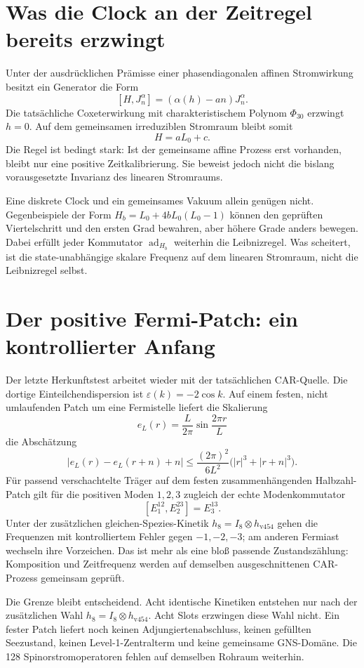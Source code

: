 \section{Was die Clock an der Zeitregel bereits erzwingt}
Unter der ausdrücklichen Prämisse einer phasendiagonalen affinen Stromwirkung besitzt ein Generator die Form
\[
 [H,J_n^\alpha]=(\alpha(h)-an)J_n^\alpha.
\]
Die tatsächliche Coxeterwirkung mit charakteristischem Polynom $\Phi_{30}$ erzwingt $h=0$. Auf dem gemeinsamen irreduziblen Stromraum bleibt somit
\[
 H=aL_0+c.
\]
Die Regel ist bedingt stark: Ist der gemeinsame affine Prozess erst vorhanden, bleibt nur eine positive Zeitkalibrierung. Sie beweist jedoch nicht die bislang vorausgesetzte Invarianz des linearen Stromraums. 

Eine diskrete Clock und ein gemeinsames Vakuum allein genügen nicht. Gegenbeispiele der Form $H_b=L_0+4bL_0(L_0-1)$ können den geprüften Viertelschritt und den ersten Grad bewahren, aber höhere Grade anders bewegen. Dabei erfüllt jeder Kommutator $\operatorname{ad}_{H_b}$ weiterhin die Leibnizregel. Was scheitert, ist die state-unabhängige skalare Frequenz auf dem linearen Stromraum, nicht die Leibnizregel selbst. 

\section{Der positive Fermi-Patch: ein kontrollierter Anfang}
Der letzte Herkunftstest arbeitet wieder mit der tatsächlichen CAR-Quelle. Die dortige Einteilchendispersion ist $\varepsilon(k)=-2\cos k$. Auf einem festen, nicht umlaufenden Patch um eine Fermistelle liefert die Skalierung
\[
 e_L(r)=\frac L{2\pi}\sin\frac{2\pi r}L
\]
die Abschätzung
\[
 \bigl|e_L(r)-e_L(r+n)+n\bigr|
 \le\frac{(2\pi)^2}{6L^2}\bigl(|r|^3+|r+n|^3\bigr).
\]
Für passend verschachtelte Träger auf dem festen zusammenhängenden Halbzahl-Patch gilt für die positiven Moden $1,2,3$ zugleich der echte Modenkommutator
\[
 [E^{12}_1,E^{23}_2]=E^{13}_3.
\]
Unter der zusätzlichen gleichen-Spezies-Kinetik $h_8=I_8\otimes h_{\mathrm{v454}}$ gehen die Frequenzen mit kontrolliertem Fehler gegen $-1,-2,-3$; am anderen Fermiast wechseln ihre Vorzeichen. Das ist mehr als eine bloß passende Zustandszählung: Komposition und Zeitfrequenz werden auf demselben ausgeschnittenen CAR-Prozess gemeinsam geprüft. 

Die Grenze bleibt entscheidend. Acht identische Kinetiken entstehen nur nach der zusätzlichen Wahl $h_8=I_8\otimes h_{\mathrm{v454}}$. Acht Slots erzwingen diese Wahl nicht. Ein fester Patch liefert noch keinen Adjungiertenabschluss, keinen gefüllten Seezustand, keinen Level-1-Zentralterm und keine gemeinsame GNS-Domäne. Die 128 Spinorstromoperatoren fehlen auf demselben Rohraum weiterhin.

